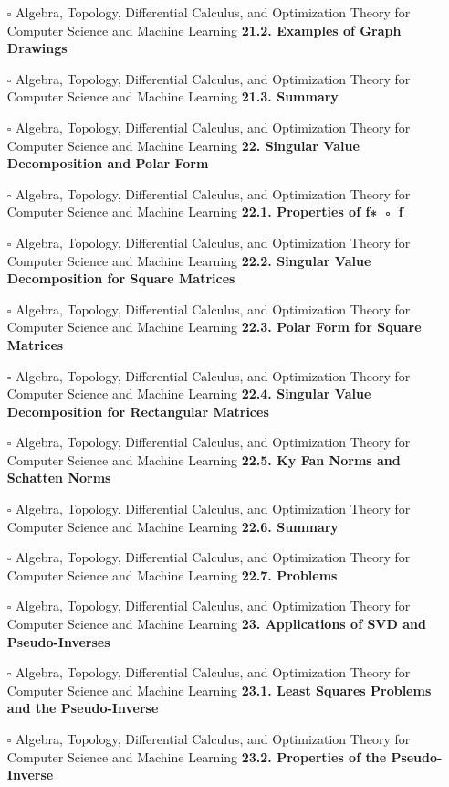 \documentclass[a4, landscape, 12pt]{article}
\newcommand{\checkbox}{$\square$}%
\begin{document}
\begin{itemize}
{}
\item [\checkbox]  Algebra, Topology, Differential Calculus, and Optimization Theory for Computer Science and Machine Learning \textbf{ 21.2. Examples of Graph Drawings
}
\item [\checkbox]  Algebra, Topology, Differential Calculus, and Optimization Theory for Computer Science and Machine Learning \textbf{ 21.3. Summary
}
\item [\checkbox]  Algebra, Topology, Differential Calculus, and Optimization Theory for Computer Science and Machine Learning \textbf{ 22. Singular Value Decomposition and Polar Form
}
\item [\checkbox]  Algebra, Topology, Differential Calculus, and Optimization Theory for Computer Science and Machine Learning \textbf{ 22.1. Properties of f∗ ◦ f
}
\item [\checkbox]  Algebra, Topology, Differential Calculus, and Optimization Theory for Computer Science and Machine Learning \textbf{ 22.2. Singular Value Decomposition for Square Matrices
}
\item [\checkbox]  Algebra, Topology, Differential Calculus, and Optimization Theory for Computer Science and Machine Learning \textbf{ 22.3. Polar Form for Square Matrices
}
\item [\checkbox]  Algebra, Topology, Differential Calculus, and Optimization Theory for Computer Science and Machine Learning \textbf{ 22.4. Singular Value Decomposition for Rectangular Matrices
}
\item [\checkbox]  Algebra, Topology, Differential Calculus, and Optimization Theory for Computer Science and Machine Learning \textbf{ 22.5. Ky Fan Norms and Schatten Norms
}
\item [\checkbox]  Algebra, Topology, Differential Calculus, and Optimization Theory for Computer Science and Machine Learning \textbf{ 22.6. Summary
}
\item [\checkbox]  Algebra, Topology, Differential Calculus, and Optimization Theory for Computer Science and Machine Learning \textbf{ 22.7. Problems
}
\item [\checkbox]  Algebra, Topology, Differential Calculus, and Optimization Theory for Computer Science and Machine Learning \textbf{ 23. Applications of SVD and Pseudo-Inverses
}
\item [\checkbox]  Algebra, Topology, Differential Calculus, and Optimization Theory for Computer Science and Machine Learning \textbf{ 23.1. Least Squares Problems and the Pseudo-Inverse
}
\item [\checkbox]  Algebra, Topology, Differential Calculus, and Optimization Theory for Computer Science and Machine Learning \textbf{ 23.2. Properties of the Pseudo-Inverse
}
\end{itemize}
\end{document}
